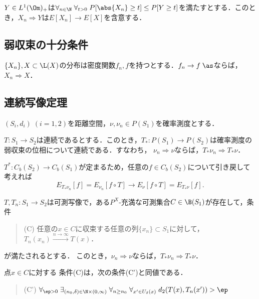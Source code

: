 \documentclass[uplatex,dvipdfmx]{jsreport}
\begin{document}
\begin{theorem}[優収束定理]
    $Y\in L^1(\Om)_+$は$\forall_{n\in\N}\;\forall_{t>0}\;P[\abs{X_n}\ge t]\le P[Y\ge t]$を満たすとする．このとき，$X_n\Rightarrow Y$は$E[X_n]\to E[X]$を含意する．
\end{theorem}

\subsection{弱収束の十分条件}

\begin{proposition}[密度関数が概収束するならば弱収束する]
    $\{X_n\},X\subset\L(X)$の分布は密度関数$f_n,f$を持つとする．$f_n\to f\;\as$ならば，$X_n\Rightarrow X$．
\end{proposition}

\subsection{連続写像定理}

\begin{notation}
    $(S_i,d_i)\;(i=1,2)$を距離空間，$\nu,\nu_n\in P(S_1)$を確率測度とする．
\end{notation}

\begin{proposition}[連続写像は弱連続作用素を引き起こす]
    $T:S_1\to S_2$は連続であるとする．このとき，$T_*:P(S_1)\to P(S_2)$は確率測度の弱収束の位相について連続である．すなわち，
    $\nu_n\Rightarrow\nu$ならば，$T_*\nu_n\Rightarrow T_*\nu$．
\end{proposition}
\begin{Proof}
    $T^*:C_b(S_2)\to C_b(S_1)$が定まるため，任意の$f\in C_b(S_2)$について引き戻して考えれば
    \[E_{T_*\nu_n}[f]=E_{\nu_n}[f\circ T]\to E_\nu[f\circ T]=E_{T_*\nu}[f].\]
\end{Proof}

\begin{corollary}[擬連続写像列に対する一般化]
    $T,T_n:S_1\to S_2$は可測写像で，ある$P^X$-充満な可測集合$C\in\B(S_1)$が存在して，条件
    \begin{quote}
        (C) 任意の$x\in C$に収束する任意の列$\{x_n\}\subset S_1$に対して，$T_n(x_n)\xrightarrow{n\to\infty}T(x)$．
    \end{quote}
    が満たされるとする．
    このとき，$\nu_n\Rightarrow\nu$ならば，$T_*\nu_n\Rightarrow T_*\nu$．
\end{corollary}

\begin{lemma}
    点$x\in C$に対する
    条件(C)は，次の条件(C')と同値である．
    \begin{quote}
        (C') $\forall_{\ep>0}\;\exists_{(n_0,\delta)\in\N\times(0,\infty)}\;\forall_{n\ge n_0}\;\forall_{x'\in U_\delta(x)}\;d_2(T(x),T_n(x'))>\ep$
    \end{quote}
\end{lemma}
\end{document}
